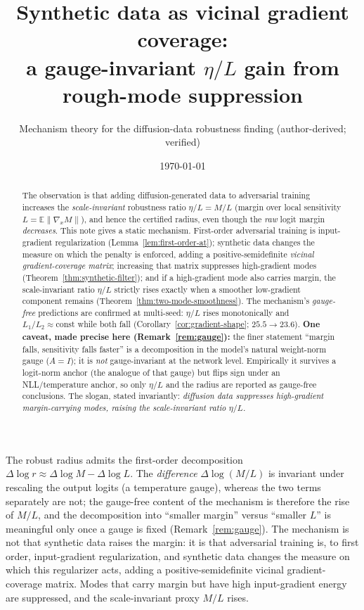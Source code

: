 \documentclass[11pt]{article}
\title{Synthetic data as vicinal gradient coverage:\\
a gauge-invariant $\eta/L$ gain from rough-mode suppression}
\author{Mechanism theory for the diffusion-data robustness finding (author-derived; verified)}
\date{\today}
\theoremstyle{definition}
\newcommand{\E}{\mathbb{E}}
\begin{document}
\maketitle

\begin{abstract}
The observation is that adding diffusion-generated data to adversarial training increases the
\emph{scale-invariant} robustness ratio $\eta/L=M/L$ (margin over local sensitivity
$L=\E\|\nabla_x M\|$), and hence the certified radius, even though the \emph{raw} logit margin
\emph{decreases}. This note gives a static mechanism. First-order adversarial training is input-gradient
regularization (Lemma~\ref{lem:first-order-at}); synthetic data changes the measure on which the penalty is
enforced, adding a positive-semidefinite \emph{vicinal gradient-coverage matrix}; increasing that matrix
suppresses high-gradient modes (Theorem~\ref{thm:synthetic-filter}); and if a high-gradient mode also
carries margin, the scale-invariant ratio $\eta/L$ strictly rises exactly when a smoother low-gradient
component remains (Theorem~\ref{thm:two-mode-smoothness}). The mechanism's \emph{gauge-free} predictions
are confirmed at multi-seed: $\eta/L$ rises monotonically and $L_1/L_2\approx\text{const}$ while both fall
(Corollary~\ref{cor:gradient-shape}; $25.5\to23.6$). \textbf{One caveat, made precise here
(Remark~\ref{rem:gauge}):} the finer statement ``margin falls, sensitivity falls faster'' is a
decomposition in the model's natural weight-norm gauge ($A=I$); it is \emph{not} gauge-invariant at the
network level. Empirically it survives a logit-norm anchor (the analogue of that gauge) but flips sign
under an NLL/temperature anchor, so only $\eta/L$ and the radius are reported as gauge-free conclusions.
The slogan, stated invariantly: \emph{diffusion data suppresses high-gradient margin-carrying modes,
raising the scale-invariant ratio $\eta/L$.}
\end{abstract}

The robust radius admits the first-order decomposition $\Delta\log r\approx\Delta\log M-\Delta\log L$. The
\emph{difference} $\Delta\log(M/L)$ is invariant under rescaling the output logits (a temperature gauge),
whereas the two terms separately are not; the gauge-free content of the mechanism is therefore the rise of
$M/L$, and the decomposition into ``smaller margin'' versus ``smaller $L$'' is meaningful only once a gauge
is fixed (Remark~\ref{rem:gauge}). The mechanism is not that synthetic data raises the margin: it is that
adversarial training is, to first order, input-gradient regularization, and synthetic data changes the
measure on which this regularizer acts, adding a positive-semidefinite vicinal gradient-coverage matrix.
Modes that carry margin but have high input-gradient energy are suppressed, and the scale-invariant proxy
$M/L$ rises.
\end{document}
